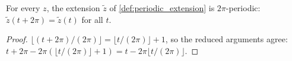 \begin{lemma}
  \label{lem:periodic_extension_periodic}
  For every $z$, the extension $\tilde z$ of \cref{def:periodic_extension} is
  $2\pi$-periodic: $\tilde z(t+2\pi)=\tilde z(t)$ for all $t$.
\end{lemma}

\begin{proof}

\leanok
  $\lfloor(t+2\pi)/(2\pi)\rfloor=\lfloor t/(2\pi)\rfloor+1$, so the reduced arguments
  agree: $t+2\pi-2\pi(\lfloor t/(2\pi)\rfloor+1)=t-2\pi\lfloor t/(2\pi)\rfloor$.
\end{proof}

\begin{lemma}


\end{lemma}
